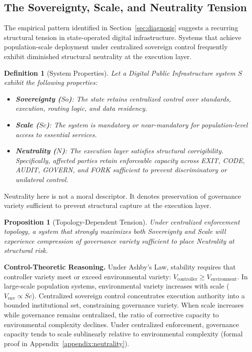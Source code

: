\documentclass{article}
\newtheorem{definition}{Definition}
\newtheorem{proposition}{Proposition}
\begin{document}
\subsection{The Sovereignty, Scale, and Neutrality Tension}
\label{subsec:trilemma}

The empirical pattern identified in Section~\ref{sec:diagnosis} suggests a recurring structural tension in state-operated digital infrastructure. Systems that achieve population-scale deployment under centralized sovereign control frequently exhibit diminished structural neutrality at the execution layer.

\begin{definition}[System Properties]
Let a Digital Public Infrastructure system $S$ exhibit the following properties:
\begin{itemize}[noitemsep]
    \item \textbf{Sovereignty ($So$)}: The state retains centralized control over standards, execution, routing logic, and data residency.
    \item \textbf{Scale ($Sc$)}: The system is mandatory or near-mandatory for population-level access to essential services.
    \item \textbf{Neutrality ($N$)}: The execution layer satisfies structural corrigibility. Specifically, affected parties retain enforceable capacity across EXIT, CODE, AUDIT, GOVERN, and FORK sufficient to prevent discriminatory or unilateral control.
\end{itemize}
\end{definition}

Neutrality here is not a moral descriptor. It denotes preservation of governance variety sufficient to prevent structural capture at the execution layer.

\begin{proposition}[Topology-Dependent Tension]
\label{prop:trilemma}
Under centralized enforcement topology, a system that strongly maximizes both Sovereignty and Scale will experience compression of governance variety sufficient to place Neutrality at structural risk.
\end{proposition}

\textbf{Control-Theoretic Reasoning.} Under Ashby's Law, stability requires that controller variety meet or exceed environmental variety: $V_{\text{controller}} \geq V_{\text{environment}}$. In large-scale population systems, environmental variety increases with scale ($V_{\text{env}} \propto Sc$). Centralized sovereign control concentrates execution authority into a bounded institutional set, constraining governance variety. When scale increases while governance remains centralized, the ratio of corrective capacity to environmental complexity declines. Under centralized enforcement, governance capacity tends to scale sublinearly relative to environmental complexity (formal proof in Appendix~\ref{appendix:neutrality}).
\end{document}
